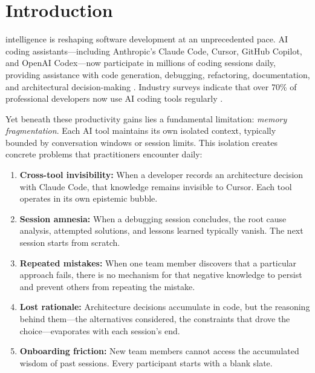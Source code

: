 \documentclass[10pt,journal,compsoc]{IEEEtran}
\begin{document}
\section{Introduction}

 intelligence is reshaping software development at an unprecedented pace. AI coding assistants---including Anthropic's Claude Code, Cursor, GitHub Copilot, and OpenAI Codex---now participate in millions of coding sessions daily, providing assistance with code generation, debugging, refactoring, documentation, and architectural decision-making \cite{vaithilingam2022expectation,barke2023grounded}. Industry surveys indicate that over 70\% of professional developers now use AI coding tools regularly \cite{github2023survey}.

Yet beneath these productivity gains lies a fundamental limitation: \emph{memory fragmentation}. Each AI tool maintains its own isolated context, typically bounded by conversation windows or session limits. This isolation creates concrete problems that practitioners encounter daily:

\begin{enumerate}
\item \textbf{Cross-tool invisibility:} When a developer records an architecture decision with Claude Code, that knowledge remains invisible to Cursor. Each tool operates in its own epistemic bubble.

\item \textbf{Session amnesia:} When a debugging session concludes, the root cause analysis, attempted solutions, and lessons learned typically vanish. The next session starts from scratch.

\item \textbf{Repeated mistakes:} When one team member discovers that a particular approach fails, there is no mechanism for that negative knowledge to persist and prevent others from repeating the mistake.

\item \textbf{Lost rationale:} Architecture decisions accumulate in code, but the reasoning behind them---the alternatives considered, the constraints that drove the choice---evaporates with each session's end.

\item \textbf{Onboarding friction:} New team members cannot access the accumulated wisdom of past sessions. Every participant starts with a blank slate.
\end{enumerate}
\end{document}
